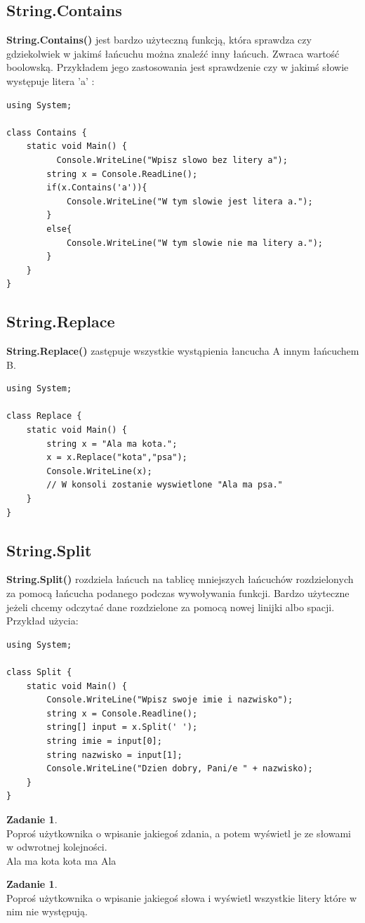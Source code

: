 \documentclass[a4paper]{article}
\theoremstyle{definition}
\newtheorem{zadanie}[theorem]{Zadanie}
\begin{document}
\subsection{String.Contains}
\textbf{String.Contains()} jest bardzo użyteczną funkcją, która sprawdza czy gdziekolwiek w jakimś łańcuchu można znaleźć inny łańcuch. Zwraca wartość boolowską. Przykładem jego zastosowania jest sprawdzenie czy w jakimś słowie występuje litera 'a' :\\
\begin{lstlisting}[frame=single]
using System;

class Contains {
    static void Main() {
    	  Console.WriteLine("Wpisz slowo bez litery a");
        string x = Console.ReadLine();
        if(x.Contains('a')){
        	Console.WriteLine("W tym slowie jest litera a.");
        }
        else{
        	Console.WriteLine("W tym slowie nie ma litery a.");
        }
    }
}
\end{lstlisting}
\subsection{String.Replace}
\textbf{String.Replace()} zastępuje wszystkie wystąpienia łancucha A innym łańcuchem B.\\
\begin{lstlisting}[frame=single]
using System;

class Replace {
    static void Main() {
        string x = "Ala ma kota.";
        x = x.Replace("kota","psa");
        Console.WriteLine(x);
        // W konsoli zostanie wyswietlone "Ala ma psa."
    }
}
\end{lstlisting}
\subsection{String.Split}
\textbf{String.Split()} rozdziela łańcuch na tablicę mniejszych łańcuchów rozdzielonych za pomocą łańcucha podanego podczas wywoływania funkcji. Bardzo użyteczne jeżeli chcemy odczytać dane rozdzielone za pomocą nowej linijki albo spacji. Przykład użycia:\\
\begin{lstlisting}[frame=single]
using System;

class Split {
    static void Main() {
        Console.WriteLine("Wpisz swoje imie i nazwisko");
        string x = Console.Readline();
        string[] input = x.Split(' ');
        string imie = input[0];
        string nazwisko = input[1];
        Console.WriteLine("Dzien dobry, Pani/e " + nazwisko);
    }
}
\end{lstlisting}
\begin{zadanie}
\\Poproś użytkownika o wpisanie jakiegoś zdania, a potem wyświetl je ze słowami w odwrotnej kolejności.
\\\textrm{Ala ma kota \rightarrow \textrm{kota  ma  Ala}}
\end{zadanie}
\begin{zadanie}
\\Poproś użytkownika o wpisanie jakiegoś słowa i wyświetl wszystkie litery które w nim nie występują.
\end{zadanie}
\pagebreak
\end{document}
